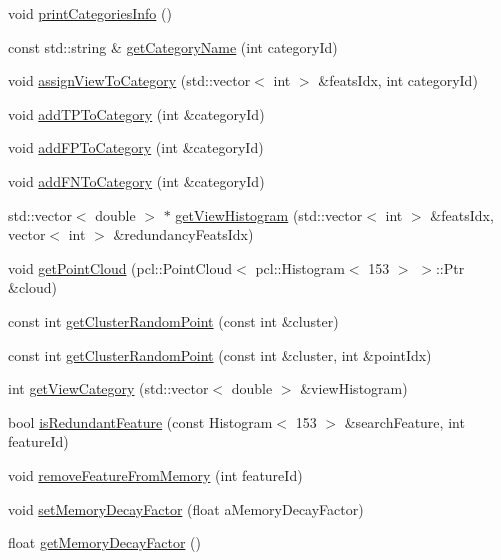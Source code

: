 \begin{DoxyCompactItemize}
\item 
void \hyperlink{class_memory_aeee28733d4a736e1c37a373405a532d4}{print\+Categories\+Info} ()
\item 
const std\+::string \& \hyperlink{class_memory_a80ad5f670ba87f74c170e5623f8eefc6}{get\+Category\+Name} (int category\+Id)
\item 
void \hyperlink{class_memory_a90b1dfcf945ed2b899e8c67febb23300}{assign\+View\+To\+Category} (std\+::vector$<$ int $>$ \&feats\+Idx, int category\+Id)
\item 
void \hyperlink{class_memory_af222808fa4add918c102916128ccef05}{add\+T\+P\+To\+Category} (int \&category\+Id)
\item 
void \hyperlink{class_memory_acf7decf375ad87f9997b1a295d1bf02b}{add\+F\+P\+To\+Category} (int \&category\+Id)
\item 
void \hyperlink{class_memory_a25af58af1f3c43808ec5c76f68ca6b31}{add\+F\+N\+To\+Category} (int \&category\+Id)
\item 
std\+::vector$<$ double $>$ $\ast$ \hyperlink{class_memory_a137b4cca30a6eb6bce929f53112cbb40}{get\+View\+Histogram} (std\+::vector$<$ int $>$ \&feats\+Idx, vector$<$ int $>$ \&redundancy\+Feats\+Idx)
\item 
void \hyperlink{class_memory_a9861a7a0fa823cc992f96651a08a177d}{get\+Point\+Cloud} (pcl\+::\+Point\+Cloud$<$ pcl\+::\+Histogram$<$ 153 $>$ $>$\+::Ptr \&cloud)
\item 
const int \hyperlink{class_memory_a54eea5f00668704da0dac9fb91f4773e}{get\+Cluster\+Random\+Point} (const int \&cluster)
\item 
const int \hyperlink{class_memory_a3a327af9dcb4c8f6213833b880564620}{get\+Cluster\+Random\+Point} (const int \&cluster, int \&point\+Idx)
\item 
int \hyperlink{class_memory_a7be462960a5fa5fdd8ab63dd980a56c2}{get\+View\+Category} (std\+::vector$<$ double $>$ \&view\+Histogram)
\item 
bool \hyperlink{class_memory_ae520566ff0cd3b122c0773825141f567}{is\+Redundant\+Feature} (const Histogram$<$ 153 $>$ \&search\+Feature, int feature\+Id)
\item 
void \hyperlink{class_memory_a2ead3c4cac6c9fea43047ae1c63b5a54}{remove\+Feature\+From\+Memory} (int feature\+Id)
\item 
void \hyperlink{class_memory_ab9449f7b75eeb52bf50a9e4ae08da8f0}{set\+Memory\+Decay\+Factor} (float a\+Memory\+Decay\+Factor)
\item 
float \hyperlink{class_memory_a03d6c9fa9594c8385bfe30a4c6253757}{get\+Memory\+Decay\+Factor} ()

\end{DoxyCompactItemize}
